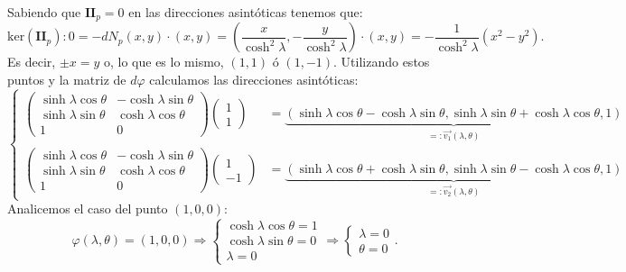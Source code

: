 Sabiendo que $\mathbf{II}_p = 0$ en las direcciones asintóticas tenemos que:
\[
\mathrm{ker} \left( \mathbf{II}_p \right): 0 = -dN_p \left( x, y \right) \cdot
\left( x, y \right) = \left( \frac{x}{\cosh^2 \lambda}, -\frac{y}{\cosh^2
\lambda} \right) \cdot \left( x, y \right) = -\frac{1}{\cosh^2 \lambda} \left(
x^2 - y^2 \right).
\]
Es decir, $\pm x = y$ o, lo que es lo mismo, $\left( 1, 1 \right)$ ó $\left( 1,
-1\right)$. Utilizando estos puntos y la matriz de $d \varphi$ calculamos las
direcciones asintóticas: 
\[
\begin{cases}
    \begin{pmatrix} 
    \sinh \lambda \cos \theta & -\cosh \lambda \sin \theta\\
    \sinh \lambda \sin \theta & \cosh \lambda \cos \theta\\
    1 & 0
    \end{pmatrix} \begin{pmatrix} 1 \\ 1 \end{pmatrix} &= 
\underbrace{\left( \sinh \lambda \cos \theta - \cosh \lambda \sin \theta, \sinh \lambda
    \sin \theta + \cosh \lambda \cos \theta, 1
\right)}_{=: \overrightarrow{v_1}\left( \lambda, \theta \right)}\\

    \begin{pmatrix} 
    \sinh \lambda \cos \theta & -\cosh \lambda \sin \theta\\
    \sinh \lambda \sin \theta & \cosh \lambda \cos \theta\\
    1 & 0
    \end{pmatrix} \begin{pmatrix} 1 \\ -1 \end{pmatrix} &= 
    \underbrace{\left( \sinh \lambda \cos \theta + \cosh \lambda \sin \theta, \sinh \lambda
    \sin \theta - \cosh \lambda \cos \theta, 1 \right)}_{=:
    \overrightarrow{v_2}\left( \lambda, \theta \right)}
\end{cases}
\]
Analicemos el caso del punto $\left( 1, 0, 0 \right)$:
\[
\varphi\left( \lambda, \theta \right) = \left( 1, 0, 0 \right) \Rightarrow \begin{cases}
    \cosh \lambda \cos \theta = 1\\
    \cosh \lambda \sin \theta = 0\\
    \lambda = 0
\end{cases} \Rightarrow \begin{cases}
    \lambda = 0\\
    \theta = 0
\end{cases}.
\]
